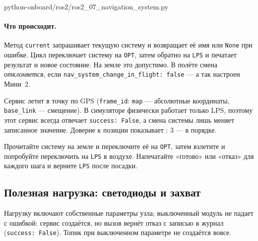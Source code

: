 \begin{codefile}[python]{python-onboard/ros2/ros2_07_navigation_system.py}
\end{codefile}

\paragraph{Что происходит.} Метод \verb|current| запрашивает текущую систему и возвращает её имя или \verb|None| при ошибке. Цикл переключает систему на \texttt{OPT}, затем обратно на \texttt{LPS} и печатает результат и новое состояние. На земле это допустимо. В полёте смена \emph{отклоняется}, если \verb|nav_system_change_in_flight: false| --- а так настроен Мини~2.

\begin{infobox}
Сервис  летит в точку по GPS (\verb|frame_id|: \verb|map| --- абсолютные координаты, \verb|base_link| --- смещение). В симуляторе физически работает только LPS, поэтому этот сервис всегда отвечает \verb|success: False|, а смена системы лишь меняет записанное значение. Доверие к позиции показывает : 3 --- в порядке.
\end{infobox}

\begin{taskbox}
Прочитайте систему на земле и переключите её на \texttt{OPT}, затем взлетите и попробуйте переключить на \texttt{LPS} в воздухе. Напечатайте «готово» или «отказ» для каждого шага и верните \texttt{LPS} после посадки.
\end{taskbox}

\subsection{Полезная нагрузка: светодиоды и захват}

Нагрузку включают собственные параметры узла; выключенный модуль не падает с ошибкой: сервис создаётся, но вызов вернёт отказ с записью в журнал (\verb|success: False|). Топик  при выключенном параметре не создаётся вовсе.

